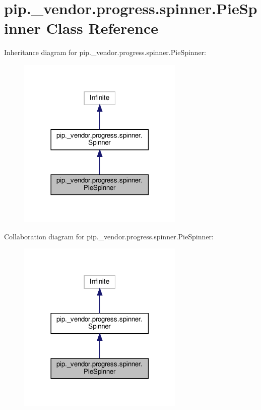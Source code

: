 \hypertarget{classpip_1_1__vendor_1_1progress_1_1spinner_1_1PieSpinner}{}\section{pip.\+\_\+vendor.\+progress.\+spinner.\+Pie\+Spinner Class Reference}
\label{classpip_1_1__vendor_1_1progress_1_1spinner_1_1PieSpinner}


Inheritance diagram for pip.\+\_\+vendor.\+progress.\+spinner.\+Pie\+Spinner\+:
\nopagebreak
\begin{figure}[H]
\begin{center}
\leavevmode
\includegraphics[width=225pt]{classpip_1_1__vendor_1_1progress_1_1spinner_1_1PieSpinner__inherit__graph}
\end{center}
\end{figure}


Collaboration diagram for pip.\+\_\+vendor.\+progress.\+spinner.\+Pie\+Spinner\+:
\nopagebreak
\begin{figure}[H]
\begin{center}
\leavevmode
\includegraphics[width=225pt]{classpip_1_1__vendor_1_1progress_1_1spinner_1_1PieSpinner__coll__graph}
\end{center}
\end{figure}
